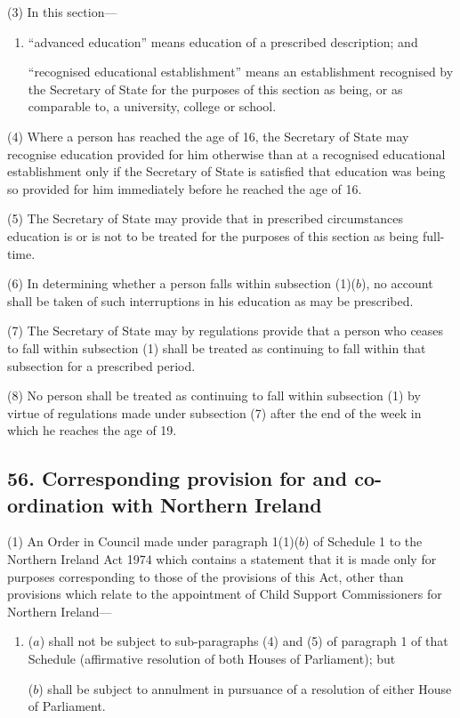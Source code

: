 \documentclass[12pt,a4paper]{article}
\begin{document}
(3) In this section—
\begin{enumerate}\item[]
    “advanced education” means education of a prescribed description; and

    “recognised educational establishment” means an establishment recognised by the Secretary of State for the purposes of this section as being, or as comparable to, a university, college or school. 
\end{enumerate}

(4) Where a person has reached the age of 16, the Secretary of State may recognise education provided for him otherwise than at a recognised educational establishment only if the Secretary of State is satisfied that education was being so provided for him immediately before he reached the age of 16.

(5) The Secretary of State may provide that in prescribed circumstances education is or is not to be treated for the purposes of this section as being full-time.

(6) In determining whether a person falls within subsection (1)($b$), no account shall be taken of such interruptions in his education as may be prescribed.

(7) The Secretary of State may by regulations provide that a person who ceases to fall within subsection (1)  shall be treated as continuing to fall within that subsection for a prescribed period.

(8) No person shall be treated as continuing to fall within subsection (1)  by virtue of regulations made under subsection (7)  after the end of the week in which he reaches the age of 19.


\subsection{56. Corresponding provision for and co-ordination with Northern Ireland}

(1) An Order in Council made under paragraph 1(1)($b$)  of Schedule 1 to the Northern Ireland Act 1974 which contains a statement that it is made only for purposes corresponding to those of the provisions of this Act, other than provisions which relate to the appointment of Child Support Commissioners for Northern Ireland—
\begin{enumerate}\item[]
($a$) shall not be subject to sub-paragraphs (4)  and (5)  of paragraph 1 of that Schedule (affirmative resolution of both Houses of Parliament); but

($b$) shall be subject to annulment in pursuance of a resolution of either House of Parliament.
\end{enumerate}
\end{document}
